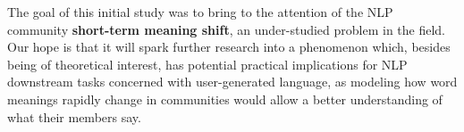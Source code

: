 
The goal of this initial study was to bring to the attention of the NLP community {\bf short-term meaning shift}, an under-studied problem in the field. 
Our hope is that it will spark further research into a phenomenon which, besides being of theoretical interest, has potential practical implications for NLP downstream tasks concerned with user-generated language, as modeling how word meanings rapidly change in communities would allow a better understanding of what their members say.

